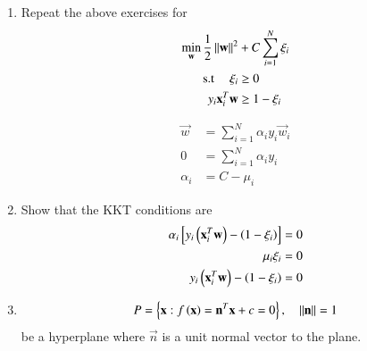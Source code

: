 \documentclass[journal,12pt,twocolumn]{IEEEtran}
\renewcommand\thesection{\arabic{section}}
\begin{document}
\begin{enumerate}[label=\thesection.\arabic*,ref=\thesection.\theenumi]
\item Repeat the above exercises for 
\begin{align}
\min_{\mathbf{w}}\frac{1}{2}\left\Vert\mathbf{w}\right\Vert^2 &+ C \sum_{i=1}^{N}\xi_i
\\
\text{s.t } \quad \xi_i &\ge 0 
\\ 
y_i\mathbf{x}_i^T\mathbf{w}&\ge1-\xi_i
\end{align}


\begin{align}
\vec{w} &= \sum_{i=1}^{N}\alpha_iy_i \vec{w}_i
\\
0 &= \sum_{i=1}^{N}\alpha_iy_i 
\\
\alpha_i &= C - \mu_i
\end{align}
\item Show that the KKT conditions are
\begin{align}
\alpha_i {}\left[y_i \left(\mathbf{x}_i^T\mathbf{w}\right)- \left(1-\xi_i\right)\right] &= 0 
\\
\mu_i \xi_i &= 0
\\
y_i \left(\mathbf{x}_i^T\mathbf{w}\right)- \left(1-\xi_i\right) & = 0
\end{align}

%
\item 
\begin{align}
P = \left\{\mathbf{x}:f\left(\mathbf{x}\right)=\mathbf{n}^T\mathbf{x} +c = 0\right\}, \quad \left\Vert\mathbf{n}\right\Vert = 1
\end{align}
be a hyperplane where $\vec{n}$ is a unit normal vector to the plane.


\end{enumerate}
\end{document}
